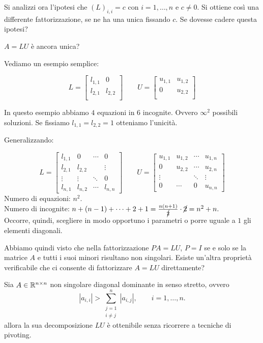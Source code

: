 Si analizzi ora l'ipotesi che $(L)_{i,i} = c$ con $i = 1, \ldots, n$ e $c \neq
0$. Si ottiene così una differente fattorizzazione, se ne ha una unica
fissando $c$. Se dovesse cadere questa ipotesi?
\begin{center}
$A = LU$ è ancora unica?
\end{center}

\begin{flushleft}
Vediamo un esempio semplice:
\end{flushleft}

\[L =
\left[
\begin{array}{cccc}
l_{1,1} & 0      \\
l_{2,1} & l_{2,2} \\
\end{array} \right]
\qquad U =
\left[
\begin{array}{cccc}
u_{1,1} & u_{1,2} \\
0      & u_{2,2} \\
\end{array} \right]
\]

In questo esempio abbiamo $4$ equazioni in $6$ incognite. Ovvero $ \infty^2 $ possibili
soluzioni. Se fissiamo $l_{1,1} = l_{2,2} = 1$ otteniamo l'unicità.
\begin{flushleft}
Generalizzando:
\end{flushleft}

\[L =
\left[
\begin{array}{cccc}
l_{1,1} & 0      & \cdots & 0 \\
l_{2,1} & l_{2,2} &        & \vdots \\
\vdots & \vdots & \ddots & 0 \\
l_{n,1} & l_{n,2} & \cdots & l_{n,n}
\end{array} \right]
\qquad U =
\left[
\begin{array}{cccc}
u_{1,1} & u_{1,2} & \cdots & u_{1,n} \\
0      & u_{2,2} & \cdots & u_{2,n} \\
\vdots &        & \ddots & \vdots  \\
0      & \cdots & 0      & u_{n,n}
\end{array} \right]
\]
Numero di equazioni: $n^2$.\\
Numero di incognite: $n + (n-1)+ \cdots + 2 + 1 = \frac{n(n+1)}{\cancel{2}}
\cdot \cancel{2} = n^2 + n.$\\
Occorre, quindi, scegliere in modo opportuno i parametri o porre uguale a $1$ gli
elementi diagonali.

Abbiamo quindi visto che nella fattorizzazione $PA=LU$, $P=I$ se e solo se la matrice
$A$ e tutti i suoi minori risultano non singolari. Esiste un'altra proprietà verificabile
che ci consente di fattorizzare $A = LU$ direttamente?

\begin{teo} Sia $A \in \mathbb{R}^{n \times n}$ non singolare diagonal dominante in senso
stretto, ovvero
\[|a_{i,i}| > \sum_{\substack{j=1 \\ i \neq j}}^{n}|a_{i,j}|, \qquad i = 1, \ldots, n.\]
allora la sua decomposizione $LU$ è ottenibile senza ricorrere a tecniche di pivoting.
\end{teo}

